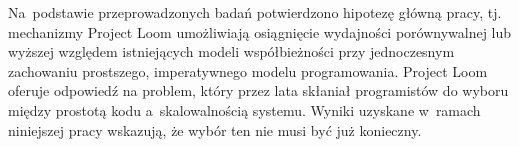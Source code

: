Na~podstawie przeprowadzonych badań potwierdzono hipotezę główną pracy, tj. mechanizmy Project Loom umożliwiają osiągnięcie wydajności porównywalnej lub wyższej względem istniejących modeli współbieżności przy jednoczesnym zachowaniu prostszego, imperatywnego modelu programowania. Project Loom oferuje odpowiedź na problem, który przez lata skłaniał programistów do wyboru między prostotą kodu a~skalowalnością systemu. Wyniki uzyskane w~ramach niniejszej pracy wskazują, że wybór ten nie musi być już konieczny.

